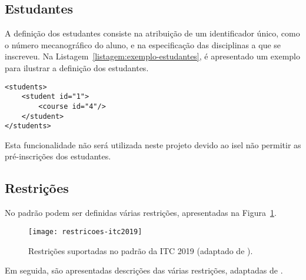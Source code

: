 
\subsection{Estudantes}

A definição dos estudantes consiste na atribuição de um identificador único, como o número mecanográfico do aluno, e na especificação das disciplinas a que se inscreveu. Na Listagem~\ref{listagem:exemplo-estudantes}, é apresentado um exemplo para ilustrar a definição dos estudantes.

\begin{minipage}[c]{\linewidth}
\begin{lstlisting}[caption={Exemplo da definição dos estudantes.}, label={listagem:exemplo-estudantes}]
<students>
    <student id="1">
        <course id="4"/>
    </student>
</students>
\end{lstlisting}
\end{minipage}

Esta funcionalidade não será utilizada neste projeto devido ao \gls{isel} não permitir as pré-inscrições dos estudantes.

\subsection{Restrições}

No padrão podem ser definidas várias restrições, apresentadas na Figura~\ref{fig:restricoes-itc2019}.

\begin{figure}[ht]
    \centering
    \texttt{[image: restricoes-itc2019]}
    \caption{Restrições suportadas no padrão da ITC 2019 (adaptado de \cite{itc2019-Website}).}
    \label{fig:restricoes-itc2019}
\end{figure}

Em seguida, são apresentadas descrições das várias restrições, adaptadas de \cite{itc2019-Website}.

